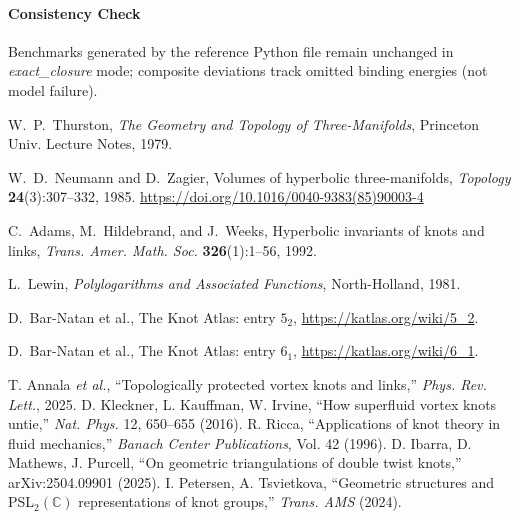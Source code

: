 \documentclass[10pt,reprint,aps,onecolumn,nofootinbib]{revtex4-2}
\begin{document}
    \paragraph{Consistency Check}
        Benchmarks generated by the reference Python file remain unchanged in \emph{exact\_closure} mode; composite deviations track omitted binding energies (not model failure).

        \nocite{*}

        
            



    
    \begin{thebibliography}{99}
        W.~P.~Thurston,
        \newblock \emph{The Geometry and Topology of Three-Manifolds},
        \newblock Princeton Univ. Lecture Notes, 1979.

        W.~D.~Neumann and D.~Zagier,
        \newblock Volumes of hyperbolic three-manifolds,
        \newblock \emph{Topology} \textbf{24}(3):307--332, 1985. \url{https://doi.org/10.1016/0040-9383(85)90003-4}

        C.~Adams, M.~Hildebrand, and J.~Weeks,
        \newblock Hyperbolic invariants of knots and links,
        \newblock \emph{Trans. Amer. Math. Soc.} \textbf{326}(1):1--56, 1992.

        L.~Lewin,
        \newblock \emph{Polylogarithms and Associated Functions},
        \newblock North-Holland, 1981.

        D.~Bar-Natan et al.,
        \newblock The Knot Atlas: entry \(5_2\),
        \newblock \url{https://katlas.org/wiki/5_2}.

        D.~Bar-Natan et al.,
        \newblock The Knot Atlas: entry \(6_1\),
        \newblock \url{https://katlas.org/wiki/6_1}.

         T. Annala \emph{et al.}, ``Topologically protected vortex knots and links,'' \emph{Phys. Rev. Lett.}, 2025.
         D. Kleckner, L. Kauffman, W. Irvine, ``How superfluid vortex knots untie,'' \emph{Nat. Phys.} 12, 650–655 (2016).
         R. Ricca, ``Applications of knot theory in fluid mechanics,'' \emph{Banach Center Publications}, Vol. 42 (1996).
         D. Ibarra, D. Mathews, J. Purcell, ``On geometric triangulations of double twist knots,'' arXiv:2504.09901 (2025).
         I. Petersen, A. Tsvietkova, ``Geometric structures and PSL$_2(\mathbb{C})$ representations of knot groups,'' \emph{Trans. AMS} (2024).



\end{thebibliography}
\end{document}
